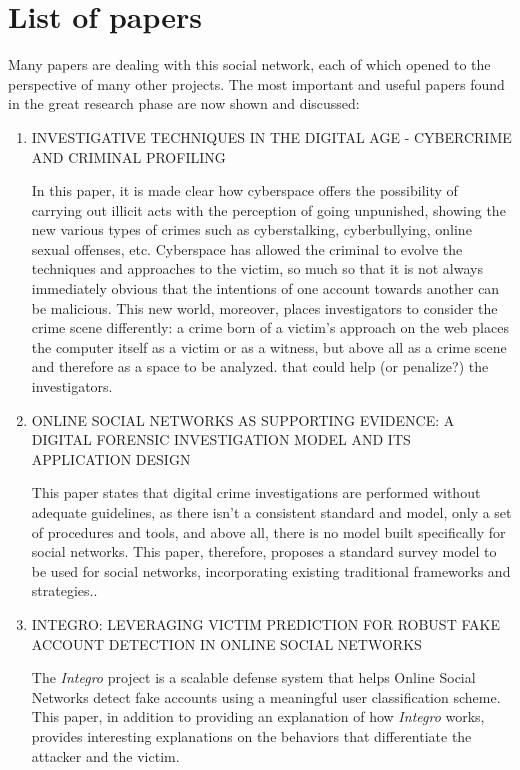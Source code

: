 \section{List of papers}
Many papers are dealing with this social network, each of which opened to the perspective of many other projects. The most important and useful papers found in the great research phase are now shown and discussed:
\begin{enumerate}
	\item 
	\textsc{INVESTIGATIVE TECHNIQUES IN THE DIGITAL AGE - CYBERCRIME AND CRIMINAL PROFILING} \parencite{site:paper1}
	\par In this paper, it is made clear how cyberspace offers the possibility of carrying out illicit acts with the perception of going unpunished, showing the new various types of crimes such as cyberstalking, cyberbullying, online sexual offenses, etc. Cyberspace has allowed the criminal to evolve the techniques and approaches to the victim, so much so that it is not always immediately obvious that the intentions of one account towards another can be malicious. This new world, moreover, places investigators to consider the crime scene differently: a crime born of a victim's approach on the web places the computer itself as a victim or as a witness, but above all as a crime scene and therefore as a space to be analyzed. that could help (or penalize?) the investigators. 
	
	\item 
	\textsc{ONLINE SOCIAL NETWORKS AS SUPPORTING EVIDENCE: A DIGITAL FORENSIC INVESTIGATION MODEL AND ITS APPLICATION DESIGN} \parencite{site:paper2}
	\par This paper states that digital crime investigations are performed without adequate guidelines, as there isn't a consistent standard and model, only a set of procedures and tools, and above all, there is no model built specifically for social networks. This paper, therefore, proposes a standard survey model to be used for social networks, incorporating existing traditional frameworks and strategies.. 
	\newpage
	\item
	\textsc{INTEGRO: LEVERAGING VICTIM PREDICTION FOR ROBUST FAKE ACCOUNT DETECTION IN ONLINE SOCIAL NETWORKS} \parencite{site:paper3}
	\par The \textit{Integro} project is a scalable defense system that helps Online Social Networks detect fake accounts using a meaningful user classification scheme. This paper, in addition to providing an explanation of how \textit{Integro} works, provides interesting explanations on the behaviors that differentiate the attacker and the victim.
	

\end{enumerate}
